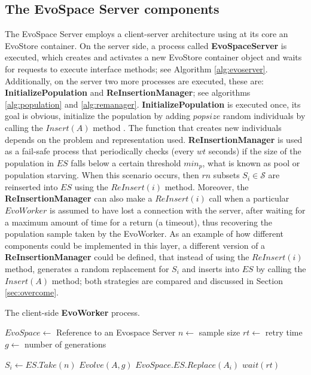 \subsection{The EvoSpace Server components}
The EvoSpace Server employs a client-server architecture using at its core an EvoStore container. On the server side, a process called \textbf{EvoSpaceServer} is executed, which creates and activates a new EvoStore container object and waits for requests to execute interface methods; see Algorithm \ref{alg:evoserver}. Additionally, on the server two more processes are executed, these are: \textbf{InitializePopulation} and \textbf{ReInsertionManager};
see algorithms \ref{alg:population} and \ref{alg:remanager}.
\textbf{InitializePopulation} is executed once, its goal is obvious, initialize the population by adding $popsize$ random
individuals by calling the $Insert(A)$ method . The function that creates new individuals depends on the problem and representation used.
\textbf{ReInsertionManager} is used as a fail-safe process that periodically checks (every $wt$ seconds) if the size of the population in $ES$
falls below a certain threshold $min_p$, what is known as pool or population starving.%
When this scenario occurs, then $rn$ subsets $S_i \in \mathcal{S}$ are reinserted into $ES$ using the $ReInsert(i)$ method.
Moreover, the \textbf{ReInsertionManager} can also make a $ReInsert(i)$ call when a particular $EvoWorker$ is assumed to have lost a connection with the server,
after waiting for a maximum amount of time for a return (a timeout), thus recovering the population sample taken by the EvoWorker.
As an example of how different components could be implemented in this layer, 
a different version of a \textbf{ReInsertionManager} could be defined, that instead of using the $ReInsert(i)$ method, generates a random replacement for $S_i$ and inserts into $ES$ by calling the $Insert(A)$ method; both strategies are compared and discussed in Section \ref{sec:overcome}.

\begin{algorithm}[t]
\caption{The client-side \textbf{EvoWorker} process.}
\begin{algorithmic}
\REQUIRE $EvoSpace \leftarrow$ Reference to an Evospace Server
\REQUIRE $n \leftarrow$ sample size
\REQUIRE $rt \leftarrow$ retry time
\REQUIRE $g \leftarrow$ number of generations

\STATE $S_i \leftarrow ES.Take(n)$
\STATE $Evolve(A,g)$
\STATE $EvoSpace.ES.Replace(A_i)$
\ELSE
\STATE $wait(rt)$
\ENDIF
\ENDWHILE
\end{algorithmic}
\label{alg:worker}
\end{algorithm}

